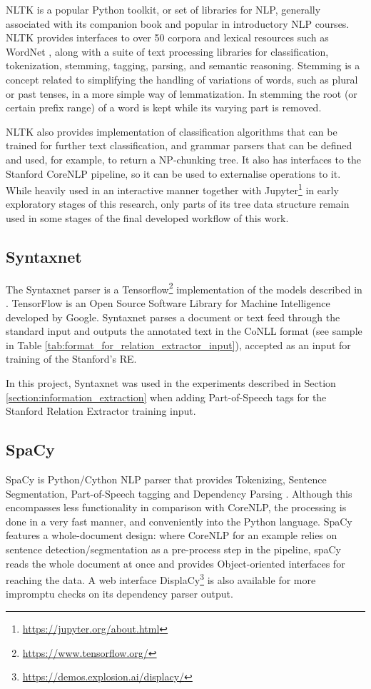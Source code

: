 \documentclass[11pt,a4paper,openright]{memoir}
\begin{document}
NLTK \cite{BirdKleinLoper09} is a popular Python toolkit, or set of libraries for NLP, generally associated with its companion book and popular in introductory NLP courses. NLTK provides interfaces to over 50 corpora and lexical resources such as WordNet \cite{Miller:1995:WLD:219717.219748}, along with a suite of text processing libraries for classification, tokenization, stemming, tagging, parsing, and semantic reasoning. Stemming is a concept related to simplifying the handling of variations of words, such as plural or past tenses, in a more simple way of lemmatization. In stemming the root (or certain prefix range) of a word is kept while its varying part is removed.

NLTK also provides implementation of classification algorithms that can be trained for further text classification, and grammar parsers that can be defined and used, for example, to return a NP-chunking tree. It also has interfaces to the Stanford CoreNLP pipeline, so it can be used to externalise operations to it. While heavily used in an interactive manner together with Jupyter\footnote{\url{https://jupyter.org/about.html}} in early exploratory stages of this research, only parts of its tree data structure remain used in some stages of the final developed workflow of this work.

\subsection{Syntaxnet}

The Syntaxnet parser \cite{google-syntaxnet} is a Tensorflow\footnote{\url{https://www.tensorflow.org/}} implementation of the models described in \cite{DBLP:journals/corr/AndorAWSPGPC16}. TensorFlow is an Open Source Software Library for Machine Intelligence developed by Google. Syntaxnet parses a document or text feed through the standard input and outputs the annotated text in the CoNLL format (see sample in Table \ref{tab:format_for_relation_extractor_input}), accepted as an input for training of the Stanford's RE.

In this project, Syntaxnet was used in the experiments described in Section \ref{section:information_extraction} when adding Part-of-Speech tags for the Stanford Relation Extractor training input.


\subsection{SpaCy}

SpaCy \cite{spacy} is Python/Cython NLP parser that provides Tokenizing, Sentence Segmentation, Part-of-Speech tagging and Dependency Parsing \cite{honnibal-johnson:2015:EMNLP}. Although this encompasses less functionality in comparison with CoreNLP, the processing is done in a very fast manner, and conveniently into the Python language. SpaCy features a whole-document design: where CoreNLP for an example relies on sentence detection/segmentation as a pre-process step in the pipeline, spaCy reads the whole document at once and provides Object-oriented interfaces for reaching the data. A web interface DisplaCy\footnote{\url{https://demos.explosion.ai/displacy/}} is also available for more impromptu checks on its dependency parser output.
\end{document}
